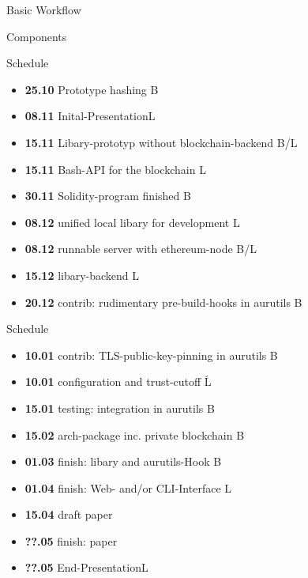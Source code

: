\documentclass{beamer}
\begin{document}
\begin{frame}{Basic Workflow}
\end{frame}

\begin{frame}{Components}

\end{frame}

\begin{frame}{Schedule}
\begin{itemize} 
	\item \textbf{25.10} Prototype hashing \hfill B
	\item \textbf{08.11} Inital-Presentation\hfill L
	\item \textbf{15.11} Libary-prototyp without blockchain-backend \hfill B/L
	\item \textbf{15.11} Bash-API for the blockchain \hfill L
	\item \textbf{30.11} Solidity-program finished \hfill B
	\item \textbf{08.12} unified local libary for development \hfill L
	\item \textbf{08.12} runnable server with ethereum-node \hfill B/L
	\item \textbf{15.12} libary-backend \hfill L
	\item \textbf{20.12} contrib: rudimentary pre-build-hooks in aurutils \hfill B
\end{itemize}
\end{frame}

\begin{frame}{Schedule}
\begin{itemize} 
	\item \textbf{10.01} contrib: TLS-public-key-pinning in aurutils \hfill B
	\item \textbf{10.01} configuration and trust-cutoff \hfill Ĺ
	\item \textbf{15.01} testing: integration in aurutils \hfill B
	\item \textbf{15.02} arch-package inc. private blockchain \hfill B
	\item \textbf{01.03} finish: libary and aurutils-Hook \hfill B
	\item \textbf{01.04} finish: Web- and/or CLI-Interface \hfill L
	\item \textbf{15.04} draft paper \hfill 
	\item \textbf{??.05} finish: paper\hfill 
	\item \textbf{??.05} End-Presentation\hfill L
\end{itemize}
\end{frame}
\end{document}
